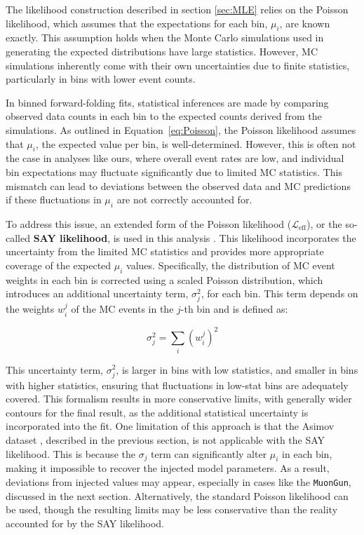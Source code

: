 The likelihood construction described in section \ref{sec:MLE} relies on the Poisson likelihood, which assumes that the expectations for each bin, $\mu_i$, are known exactly. This assumption holds when the Monte Carlo simulations used in generating the expected distributions have large statistics. However, MC simulations inherently come with their own uncertainties due to finite statistics, particularly in bins with lower event counts.

In binned forward-folding fits, statistical inferences are made by comparing observed data counts in each bin to the expected counts derived from the simulations. As outlined in Equation~\ref{eq:Poisson}, the Poisson likelihood assumes that $\mu_i$, the expected value per bin, is well-determined. However, this is often not the case in analyses like ours, where overall event rates are low, and individual bin expectations may fluctuate significantly due to limited MC statistics. This mismatch can lead to deviations between the observed data and MC predictions if these fluctuations in $\mu_i$ are not correctly accounted for.

To address this issue, an extended form of the Poisson likelihood ($\mathcal{L}_{\mathrm{eff}}$), or the so-called \textbf{SAY likelihood}, is used in this analysis . This likelihood incorporates the uncertainty from the limited MC statistics and provides more appropriate coverage of the expected $\mu_i$ values. Specifically, the distribution of MC event weights in each bin is corrected using a scaled Poisson distribution, which introduces an additional uncertainty term, $\sigma_j^2$, for each bin. This term depends on the weights $w_i^j$ of the MC events in the $j$-th bin and is defined as:

\begin{equation}
\sigma_j^2 = \sum_{i} (w_i^j)^2
\end{equation}

This uncertainty term, $\sigma_j^2$, is larger in bins with low statistics, and smaller in bins with higher statistics, ensuring that fluctuations in low-stat bins are adequately covered. This formalism results in more conservative limits, with generally wider contours for the final result, as the additional statistical uncertainty is incorporated into the fit. One limitation of this approach is that the Asimov dataset , described in the previous section, is not applicable with the SAY likelihood. This is because the $\sigma_j$ term can significantly alter $\mu_i$ in each bin, making it impossible to recover the injected model parameters. As a result, deviations from injected values may appear, especially in cases like the \texttt{MuonGun}, discussed in the next section. Alternatively, the standard Poisson likelihood can be used, though the resulting limits may be less conservative than the reality accounted for by the SAY likelihood.


